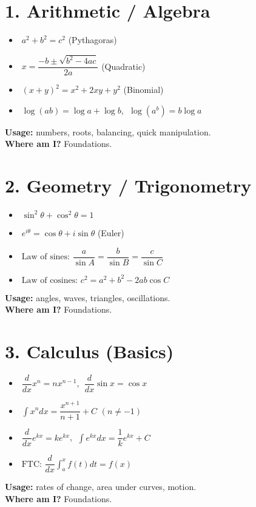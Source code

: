 \documentclass[12pt]{article}
\newcommand{\usage}[1]{\textbf{Usage:} #1}
\newcommand{\where}[1]{\textbf{Where am I?} #1}
\begin{document}
\pagestyle{empty}

\section*{1. Arithmetic / Algebra}
\begin{itemize}
  \item \(\;a^2 + b^2 = c^2\) \quad (Pythagoras)
  \item \(\;x = \dfrac{-b \pm \sqrt{b^2-4ac}}{2a}\) \quad (Quadratic)
  \item \(\; (x+y)^2 = x^2 + 2xy + y^2\) \quad (Binomial)
  \item \(\; \log(ab)=\log a + \log b\), \(\; \log(a^b)=b\log a\)
\end{itemize}
\usage{numbers, roots, balancing, quick manipulation.}\\
\where{Foundations.}

\newpage
\section*{2. Geometry / Trigonometry}
\begin{itemize}
  \item \(\; \sin^2\theta + \cos^2\theta = 1\)
  \item \(\; e^{i\theta} = \cos\theta + i\sin\theta\) \quad (Euler)
  \item \(\; \text{Law of sines: } \dfrac{a}{\sin A}=\dfrac{b}{\sin B}=\dfrac{c}{\sin C}\)
  \item \(\; \text{Law of cosines: } c^2=a^2+b^2-2ab\cos C\)
\end{itemize}
\usage{angles, waves, triangles, oscillations.}\\
\where{Foundations.}

\newpage
\section*{3. Calculus (Basics)}
\begin{itemize}
  \item \(\; \dfrac{d}{dx} x^n = n x^{n-1}\), \(\;\dfrac{d}{dx}\sin x=\cos x\)
  \item \(\; \int x^n dx = \dfrac{x^{n+1}}{n+1} + C\) \; \((n\neq -1)\)
  \item \(\; \dfrac{d}{dx} e^{kx} = k e^{kx}\), \(\; \int e^{kx}dx=\dfrac{1}{k}e^{kx}+C\)
  \item \(\; \text{FTC: } \dfrac{d}{dx}\!\int_{a}^{x} f(t)dt = f(x)\)
\end{itemize}
\usage{rates of change, area under curves, motion.}\\
\where{Foundations.}
\end{document}
